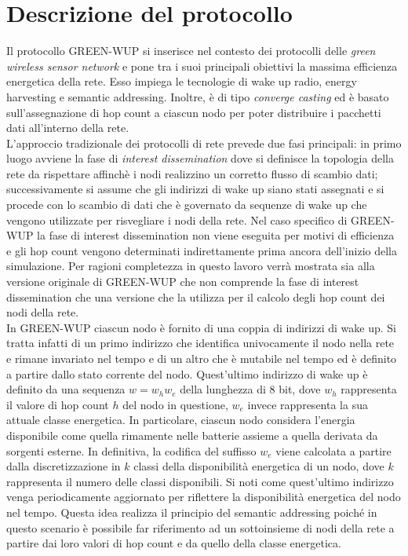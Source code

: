 \documentclass[binding=0.6cm,TFA]{sapthesis}
\begin{document}
\section{Descrizione del protocollo}

Il protocollo GREEN-WUP si inserisce nel contesto dei protocolli delle \emph{green wireless sensor network} e pone tra i suoi principali obiettivi
la massima efficienza energetica della rete. Esso impiega le tecnologie di wake up radio, energy harvesting e semantic addressing. Inoltre, è
di tipo \emph{converge casting} ed è basato sull'assegnazione di hop count a ciascun nodo per poter distribuire i pacchetti dati
all'interno della rete.\\

L'approccio tradizionale dei protocolli di rete prevede due fasi principali: in primo luogo avviene la fase di \emph{interest dissemination} dove si
definisce la topologia della rete da rispettare affinchè i nodi realizzino un corretto flusso di scambio dati; successivamente si assume che gli
indirizzi di wake up siano stati assegnati e si procede con lo scambio di dati che è governato da sequenze di wake up che vengono utilizzate per
risvegliare i nodi della rete. Nel caso specifico di GREEN-WUP la fase di interest dissemination non viene eseguita per motivi di efficienza
e gli hop count vengono determinati indirettamente prima ancora dell'inizio della simulazione. Per ragioni completezza in questo lavoro verrà
mostrata sia alla versione originale di GREEN-WUP che non comprende la fase di interest dissemination che una versione che la utilizza per
il calcolo degli hop count dei nodi della rete.\\

In GREEN-WUP ciascun nodo è fornito di una coppia di indirizzi di wake up. Si tratta infatti di un primo indirizzo che identifica univocamente
il nodo nella rete e rimane invariato nel tempo e di un altro che è mutabile nel tempo ed è definito a partire dallo stato corrente del nodo.
Quest'ultimo indirizzo di wake up è definito da una sequenza $w=w_{h}w_{e}$ della lunghezza di 8 bit, dove $w_{h}$ rappresenta il valore di hop
count $h$ del nodo in questione, $w_{e}$ invece rappresenta la sua attuale classe energetica. In particolare, ciascun nodo considera
l'energia disponibile come quella rimamente nelle batterie assieme a quella derivata da sorgenti esterne. In definitiva, la codifica del suffisso
$w_{e}$ viene calcolata a partire dalla discretizzazione in $k$ classi della disponibilità energetica di un nodo, dove $k$ rappresenta il
numero delle classi disponibili. Si noti come quest'ultimo indirizzo venga periodicamente aggiornato per riflettere la disponibilità
energetica del nodo nel tempo. Questa idea realizza il principio del semantic addressing poiché in questo scenario è possibile far riferimento
ad un sottoinsieme di nodi della rete a partire dai loro valori di hop count e da quello della classe energetica. \\
\end{document}
